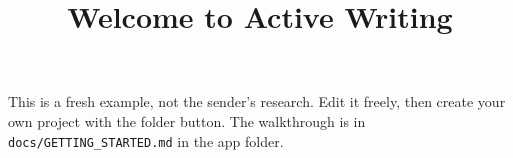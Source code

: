 \documentclass[11pt]{article}
\title{Welcome to Active Writing}
\author{}
\date{}
\begin{document}
\maketitle
This is a fresh example, not the sender's research. Edit it freely, then create
your own project with the folder button. The walkthrough is in
\texttt{docs/GETTING\_STARTED.md} in the app folder.
\tableofcontents



\appendix

\end{document}
